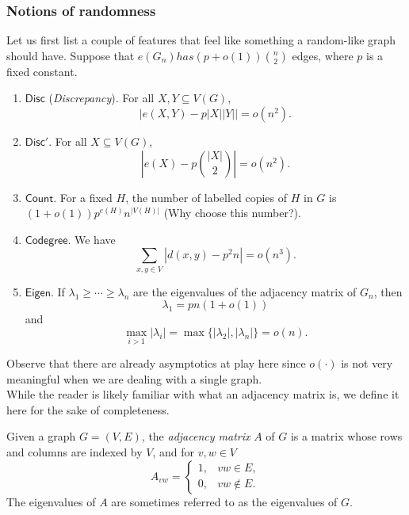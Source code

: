 		\subsubsection{Notions of randomness}

			Let us first list a couple of features that feel like something a random-like graph should have. Suppose that $e(G_n) has (p + o(1)) \binom{n}{2}$ edges, where $p$ is a fixed constant.
			\begin{enumerate}
				\item $\mathsf{Disc}$ (\emph{Discrepancy}). For all $X,Y\subseteq V(G)$, 
				\[ \left| e(X,Y) - p|X||Y| \right| = o(n^2). \]
				
				\item $\mathsf{Disc}'$. For all $X\subseteq V(G)$,
				\[ \left| e(X) - p \binom{|X|}{2} \right| = o(n^2). \]
				
				\item $\mathsf{Count}$. For a fixed $H$, the number of labelled copies of $H$ in $G$ is $(1+o(1))p^{e(H)} n^{|V(H)|}$ (Why choose this number?).
				
				\item $\mathsf{Codegree}$. We have
				\[ \sum_{x,y \in V} |d(x,y) - p^2 n| = o(n^3). \]

				\item $\mathsf{Eigen}$. If $\lambda_1 \ge \cdots \ge \lambda_n$ are the eigenvalues of the adjacency matrix of $G_n$, then
				\[ \lambda_1 = pn(1+o(1)) \]
				and
				\[ \max_{i > 1} |\lambda_i| = \max\{|\lambda_2|,|\lambda_n|\} = o(n). \]
			\end{enumerate}
			Observe that there are already asymptotics at play here since $o(\cdot)$ is not very meaningful when we are dealing with a single graph.\\

			While the reader is likely familiar with what an adjacency matrix is, we define it here for the sake of completeness.
			\begin{definition}
				Given a graph $G=(V,E)$, the \emph{adjacency matrix} $A$ of $G$ is a matrix whose rows and columns are indexed by $V$, and for $v,w\in V$
				\[
				A_{vw} =
				\begin{cases}
					1, & vw\in E, \\
					0, & vw\not\in E.
				\end{cases}
				\]
				The eigenvalues of $A$ are sometimes referred to as the eigenvalues of $G$.
			\end{definition}

